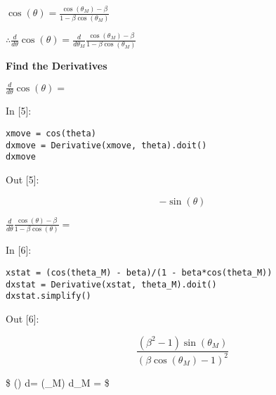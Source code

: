 \documentclass[11pt]{article}
\newif\ifcode
\newif\ifleftmargins
\newlength{\promptlength}
\newcommand{\prompt}[3]{
        \needspace{1.1cm}
        \settowidth{\promptlength}{ #1 [#3] }
        \ifleftmargins\hspace{-\promptlength}\hspace{-5pt}\fi
        {\color{#2}#1 [#3]:}
        \ifleftmargins\vspace{-2.7ex}\fi
    }
\renewcommand{\paragraph}{\textbf}
\begin{document}
\(\cos(\theta) = \frac{\cos(\theta_M) - \beta}{1 - \beta \cos(\theta_M)}\)

\(\therefore \frac{d}{d \theta} \cos(\theta) = \frac{d}{d \theta_M} \frac{\cos(\theta_M) - \beta}{1 - \beta \cos(\theta_M)}\)

    \hypertarget{find-the-derivatives}{%
\paragraph{Find the Derivatives}\label{find-the-derivatives}}

\(\frac{d}{d \theta} \cos(\theta) =\)

    
\prompt{In}{incolor}{5}
\codetrue
\begin{tcolorbox}[breakable, size=fbox, boxrule=1pt, pad at break*=1mm, colback=cellbackground, colframe=cellborder]
\begin{verbatim}
xmove = cos(theta)
dxmove = Derivative(xmove, theta).doit()
dxmove
\end{verbatim}
\end{tcolorbox}
\codefalse
 
            
\prompt{Out}{outcolor}{5}
    
    $$- \operatorname{sin}\left(\theta\right)$$

    

    \(\frac{d}{d\theta} \frac{\cos(\theta) - \beta}{1 - \beta \cos(\theta)} =\)

    
\prompt{In}{incolor}{6}
\codetrue
\begin{tcolorbox}[breakable, size=fbox, boxrule=1pt, pad at break*=1mm, colback=cellbackground, colframe=cellborder]
\begin{verbatim}
xstat = (cos(theta_M) - beta)/(1 - beta*cos(theta_M))
dxstat = Derivative(xstat, theta_M).doit()
dxstat.simplify() 
\end{verbatim}
\end{tcolorbox}
\codefalse
 
            
\prompt{Out}{outcolor}{6}
    
    $$\frac{\left(\beta^{2} - 1\right) \operatorname{sin}\left(\theta_{M}\right)}{\left(\beta \operatorname{cos}\left(\theta_{M}\right) - 1\right)^{2}}$$

    

    \$ \therefore \sin(\theta) d\theta =
 \sin(\theta\_M)
d\theta\_M \Rightarrow
{} =
 \$
\end{document}
